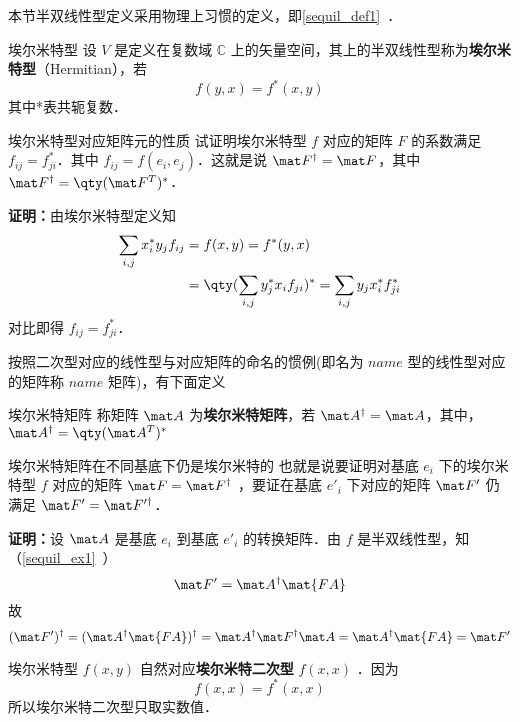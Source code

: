 本节半双线性型定义采用物理上习惯的定义，即\autoref{sequil_def1}~．
\begin{definition}{埃尔米特型}
设 $V$ 是定义在复数域 $\mathbb{C}$ 上的矢量空间，其上的半双线性型称为\textbf{埃尔米特型}（Hermitian），若
\begin{equation}\label{HeFor_eq2}
f(   y,   x)=f^*(   x,   y)
\end{equation}
其中*表共轭复数．
\end{definition}
\begin{example}{埃尔米特型对应矩阵元的性质}
试证明埃尔米特型 $f$ 对应的矩阵 $F$ 的系数满足 $f_{ij}=f_{ji}^*$．其中 $f_{ij}=f(   e_i,   e_j)$．这就是说 $\mat F^\dagger=\mat F$，其中 $\mat F^\dagger=\qty(\mat F^T)^*$．

\textbf{证明：}由埃尔米特型定义知
\begin{equation}
\begin{aligned}
\sum_{i,j}x_i^*y_j f_{ij}&=f(   x,   y)=f^*(   y,   x)\\
&=\qty(\sum_{i,j}y_j^* x_i f_{ji})^*=\sum_{i,j}y_j x_i^*f_{ji}^*
\end{aligned}
\end{equation}
对比即得 $f_{ij}=f_{ji}^*$．
\end{example}
按照二次型对应的线性型与对应矩阵的命名的惯例(即名为 $name$ 型的线性型对应的矩阵称 $name$ 矩阵)，有下面定义
\begin{definition}{埃尔米特矩阵}
称矩阵 $\mat A$ 为\textbf{埃尔米特矩阵}，若 $\mat A^\dagger=\mat A$，其中，$\mat A^\dagger=\qty(\mat A^T)^*$
\end{definition}
\begin{example}{埃尔米特矩阵在不同基底下仍是埃尔米特的}
也就是说要证明对基底 $   e_i$ 下的埃尔米特型 $f$ 对应的矩阵 $\mat F=\mat F^\dagger$ ，要证在基底 $   e'_i$ 下对应的矩阵 $\mat F'$ 仍满足 $\mat F'=\mat F'^\dagger$．

\textbf{证明：}设 $\mat A$ 是基底 $  e_i$ 到基底 $   e'_i$ 的转换矩阵．由 $f$ 是半双线性型，知（\autoref{sequil_ex1}~）
\begin{equation}
\mat F'=\mat A^\dagger \mat{FA}
\end{equation}
 故
\begin{equation}
(\mat F')^\dagger=(\mat A^\dagger \mat{FA})^\dagger=\mat A^\dagger \mat F^\dagger \mat A=\mat A^\dagger \mat{FA}=\mat F'
\end{equation}
\end{example}
埃尔米特型 $f(   x,   y)$ 自然对应\textbf{埃尔米特二次型} $f(   x,   x)$ ．因为
\begin{equation}
 f(   x,   x)= f^*(   x,   x) 
\end{equation}
所以埃尔米特二次型只取实数值．

